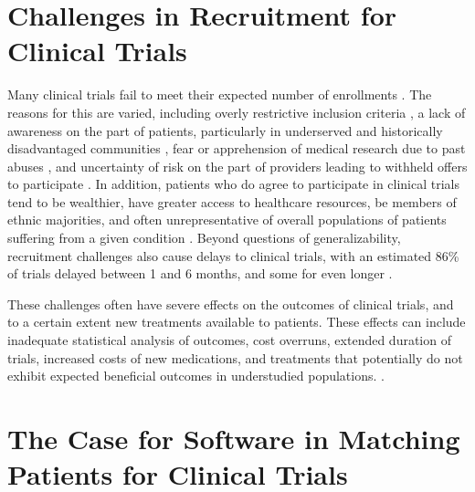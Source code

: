 \documentclass[../main.tex]{subfiles}
\begin{document}
\section{Challenges in Recruitment for Clinical Trials}

Many clinical trials fail to meet their expected number of enrollments \cite{frank2004current, grill2010addressing, gul2010clinical, heller2014strategies, adams2015barriers, nipp2019overcoming}. The reasons for this are varied, including overly restrictive inclusion criteria \cite{grill2010addressing}, a lack of awareness on the part of patients, particularly in underserved and historically disadvantaged communities \cite{heller2014strategies}, fear or apprehension of medical research due to past abuses \cite{frank2004current}, and uncertainty of risk on the part of providers leading to withheld offers to participate \cite{nipp2019overcoming}. In addition, patients who do agree to participate in clinical trials tend to be wealthier, have greater access to healthcare resources, be members of ethnic majorities, and often unrepresentative of overall populations of patients suffering from a given condition \cite{grill2010addressing, heller2014strategies, nipp2019overcoming, guadagnolo2009involving, penberthy2010automated, holmes2012increasing}. Beyond questions of generalizability, recruitment challenges also cause delays to clinical trials, with an estimated 86\% of trials delayed between 1 and 6 months, and some for even longer \cite{sullivan2004subject, thadani2009electronic}.

These challenges often have severe effects on the outcomes of clinical trials, and to a certain extent new treatments available to patients. These effects can include inadequate statistical analysis of outcomes, cost overruns, extended duration of trials, increased costs of new medications, and treatments that potentially do not exhibit expected beneficial outcomes in understudied populations. \cite{easterbrook1992fate, penberthy2010automated, mcdonald2006influences, marks2002using}.

\section{The Case for Software in Matching Patients for Clinical Trials}
\end{document}
